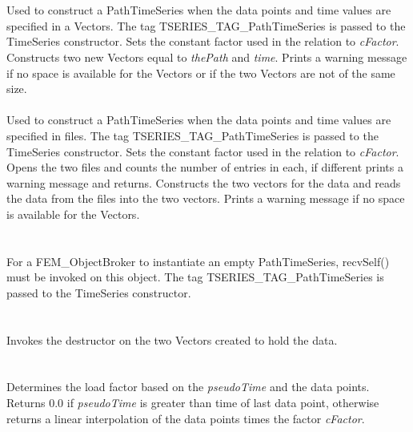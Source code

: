  \\ 
\\ 
Used to construct a PathTimeSeries when the data points and time
values are specified in a Vectors. The tag
TSERIES\_TAG\_PathTimeSeries is passed to the TimeSeries 
constructor. Sets the constant factor used in the relation to {\em
cFactor}. Constructs two new Vectors equal to {\em thePath} and {\em
time}. Prints a warning message if no space is available for the
Vectors or if the two Vectors are not of the same size.\\ 

\\  
Used to construct a PathTimeSeries when the data points and time
values are specified in files. The tag TSERIES\_TAG\_PathTimeSeries is
passed to the TimeSeries constructor. Sets the constant factor used in
the relation to {\em cFactor}. Opens the two files and counts the
number of entries in each, if different prints a warning message and
returns. Constructs the two vectors for the data and reads the data
from the files into the two vectors. Prints a warning message if no
space is available for the Vectors.\\

\\ \\
For a FEM\_ObjectBroker to instantiate an empty PathTimeSeries, recvSelf()
must be invoked on this object. The tag TSERIES\_TAG\_PathTimeSeries is
passed to the TimeSeries constructor. \\


 \\
\\ 
Invokes the destructor on the two Vectors created to hold the data. \\

 \\
\\
Determines the load factor based on the {\em pseudoTime} and the data
points. Returns $0.0$ if {\em pseudoTime} is greater than time of last
data point, otherwise returns a linear interpolation of the data
points times the factor {\em cFactor}. \\

